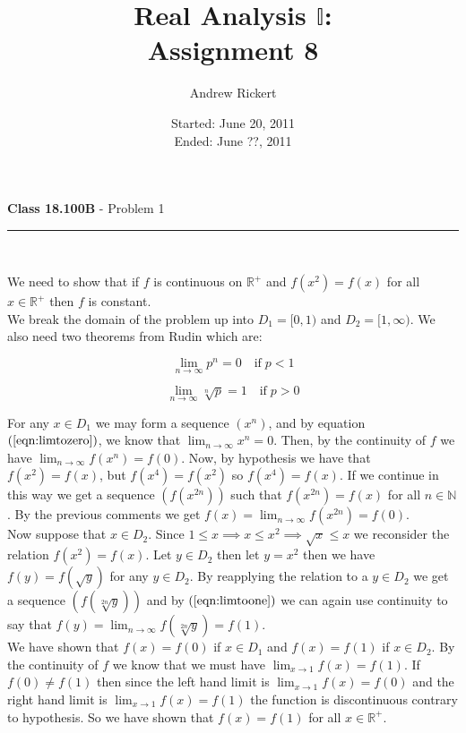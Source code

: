 \documentclass[11pt,reqno]{article}
\title{Real Analysis $\mathbb{I}$: \\ Assignment 8}
\author{Andrew Rickert}
\date{Started: June 20, 2011 \\ \hspace{1pt} Ended: June ??,  2011}                                           %
\begin{document}
\maketitle


\begin{flushleft} 
\textbf{Class 18.100B} - Problem 1\\
\rule{500pt}{1pt}\\
\end{flushleft} 

We need to show that if $f$ is continuous on $\mathbb{R}^+$ and $f(x^2) = f(x)$ for all $x \in \mathbb{R}^+$ then $f$ is constant.\\
\indent We break the domain of the problem up into $D_1 = [0,1)$ and $D_2 = [1,\infty)$. We also need two theorems from Rudin which are:


\begin{equation}
\lim_{n \to \infty} p^n = 0 \quad \text{if} \; p < 1 \label{eqn:limtozero}
\end{equation}

\begin{equation}
\lim_{n \to \infty} \sqrt[n]{p} = 1 \quad \text{if} \; p > 0 \label{eqn:limtoone}
\end{equation}


For any $x \in D_1$ we may form a sequence $(x^n)$, and by equation $(\ref{eqn:limtozero})$, we know that $\lim_{n \to \infty} x^n = 0$. Then, by the continuity of $f$ we have $\lim_{n \to \infty} f(x^n) = f(0)$. Now, by hypothesis we have that \\
$f(x^2) = f(x)$, but $f(x^4) = f(x^2)$ so $f(x^4) = f(x)$. If we continue in this way we get a sequence $(f(x^{2n}))$ such that $f(x^{2n}) = f(x)$ for all $n \in \mathbb{N}$. By the previous comments we get $f(x) = \lim_{n \to \infty} f(x^{2n}) = f(0)$.\\
\indent Now suppose that $x \in D_2$. Since $1 \le x \implies x \le x^2 \implies \sqrt{x} \le x$ we reconsider the relation $f(x^2) = f(x)$. Let $y \in D_2$ then let $y = x^2$ then we have $f(y) = f(\sqrt{y})$ for any $y \in D_2$. By reapplying the relation to a $y \in D_2$ we get a sequence $(f(\sqrt[2n]{y}))$ and by $(\ref{eqn:limtoone})$ we can again use continuity to say that $f(y) = \lim_{n \to \infty}f(\sqrt[2n]{y}) = f(1)$. \\
\indent We have shown that $f(x)= f(0)$ if $x \in D_1$ and $f(x)= f(1)$ if $x \in D_2$. By the continuity of $f$ we know that we must have $\lim_{x \to 1}f(x) = f(1)$. If $f(0) \neq f(1)$ then since the left hand limit is $\lim_{x \to 1}f(x) = f(0)$ and the right hand limit is $\lim_{x \to 1}f(x) = f(1)$ the function is discontinuous contrary to hypothesis. So we have shown that $f(x) = f(1)$ for all $x \in \mathbb{R}^+$.
\end{document}
